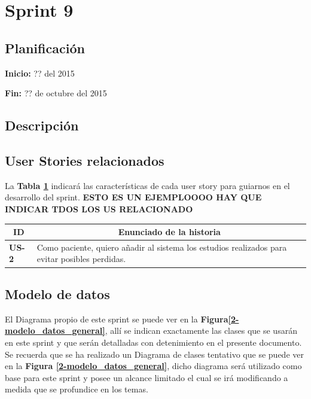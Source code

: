 \documentclass[a4paper,12pt]{article}
\begin{document}

\section{Sprint 9} %

\subsection{Planificación}

\textbf{Inicio: }?? del 2015 

\textbf{Fin:} ?? de octubre del 2015



\subsection{Descripción}

\subsection{User Stories relacionados}
La \textbf{Tabla \ref{US-Sprint3} } indicará las características de cada user story para guiarnos en el desarrollo del sprint.
\textbf{ESTO ES UN EJEMPLOOOO HAY QUE INDICAR TDOS LOS US RELACIONADO}
\begin{table}[h]
    \label{US-Sprint3}
    \centering
	\begin{tabular}{|l|p{9cm}|}
	\hline
        \multicolumn{1}{|c|}{\textbf{ID}} &
        \multicolumn{1}{|c|}{\textbf{Enunciado de la historia}} \\          
    \hline
        \textbf{US-2 } & Como paciente, quiero añadir al sistema los estudios realizados para evitar posibles perdidas.\\
     \hline 
     
    \end{tabular}

\end{table}

\subsection{Modelo de datos}
El Diagrama propio de este sprint se puede ver en la \textbf{Figura\ref{2-modelo_datos_general}}, allí se indican exactamente las clases que se usarán en este sprint y que serán detalladas con detenimiento en el presente documento. Se recuerda que se ha realizado un Diagrama de clases tentativo que se puede ver en la \textbf{Figura \ref{2-modelo_datos_general}}, dicho diagrama  será utilizado como base para este sprint y posee un alcance limitado el cual se irá modificando a medida que se profundice en los temas.
\end{document}
